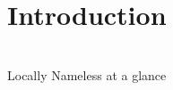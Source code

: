 \section{Introduction}

\begin{frame}
  \vfill
  \centering
  \begin{sticky}
     \\
    {\normalfont\Large Locally Nameless at a glance} \par%
  \end{sticky}
  \vfill
\end{frame}





